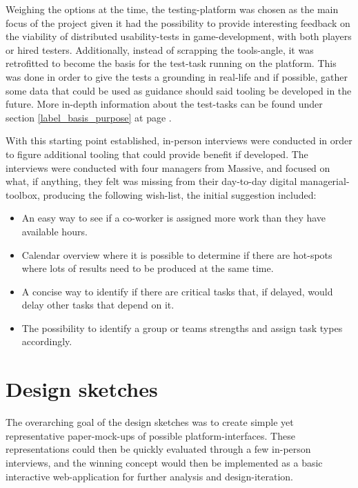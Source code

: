 {Weighing the options at the time, the testing-platform was chosen as the main
focus of the project given it had the possibility to provide interesting
feedback on the viability of distributed usability-tests in game-development,
with both players or hired testers. Additionally, instead of scrapping the
tools-angle, it was retrofitted to become the basis for the test-task running
on the platform. This was done in order to give the tests a grounding in
real-life and if possible, gather some data that could be used as guidance
should said tooling be developed in the future. More in-depth information about
the test-tasks can be found under section \ref{label_basis_purpose} at page
\pageref{label_basis_purpose}.

With this starting point established, in-person interviews were conducted
in order to figure additional tooling that could provide benefit if developed.
The interviews were conducted with four managers from Massive, and focused on
what, if anything, they felt was missing from their day-to-day digital
managerial-toolbox, producing the following wish-list, the initial
suggestion included:


  \newcommand{\ideaOne}{%
    An easy way to see if a co-worker is assigned more work than they have
    available hours.%
  }

  \newcommand{\ideaTwo}{%
    Calendar overview where it is possible to determine if there are
    hot-spots where lots of results need to be produced at the same
    time.%
  }

  \newcommand{\ideaThree}{%
    A concise way to identify if there are critical tasks that, if
    delayed, would delay other tasks that depend on it.%
  }

  \newcommand{\ideaFour}{%
    The possibility to identify a group or teams strengths and assign
    task types accordingly.%
  }

  \begin{itemize}
    \item{\ideaOne\label{label_ideas}}
    \item{\ideaTwo}
    \item{\ideaThree}
    \item{\ideaFour}
  \end{itemize}

\section{Design sketches}

	The overarching goal of the design sketches was to create simple yet
	representative paper-mock-ups of possible platform-interfaces. These
	representations  could then be quickly evaluated through a few in-person
	interviews, and the winning concept would then be implemented as a basic
	interactive web-application for further analysis and design-iteration.

}
